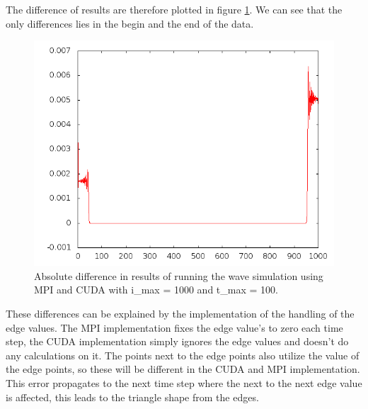 \documentclass[a4paper]{article}
\begin{document}
		\noindent The difference of results are therefore plotted in figure \ref{fig:resultsDiff}.
		We can see that the only differences lies in the begin and the end of the data.
		
		\begin{figure}[H]
			\begin{center}
				\includegraphics[scale=0.5]{results_diff}
			\end{center}
			\caption{Absolute difference in results of running the wave simulation using MPI and CUDA with i\_max = 1000 and t\_max = 100.}
			\label{fig:resultsDiff}
		\end{figure}
		
		\noindent These differences can be explained by the implementation of the handling of the edge values.
		The MPI implementation fixes the edge value's to zero each time step, the CUDA implementation simply ignores the edge values and doesn't do any calculations on it.
		The points next to the edge points also utilize the value of the edge points, so these will be different in the CUDA and MPI implementation.
		This error propagates to the next time step where the next to the next edge value is affected, this leads to the triangle shape from the edges.
		

	
\end{document}
